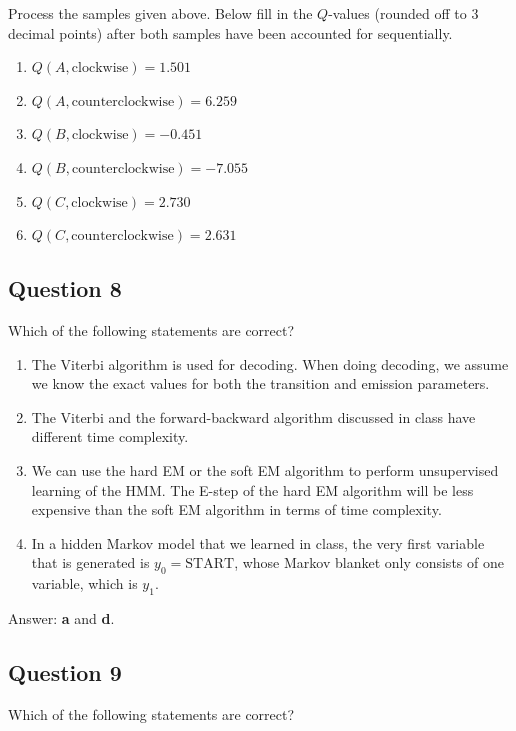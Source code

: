 \documentclass[11pt,fancychapters]{article}
\begin{document}
Process the samples given above. Below fill in the $Q$-values (rounded off to 3 decimal points) after both samples have been accounted for sequentially.

\begin{enumerate}[label=\textbf{\arabic*.}]
	\item $Q(A, \text{clockwise}) = 1.501$
	\item $Q(A, \text{counterclockwise}) = 6.259$
	\item $Q(B, \text{clockwise}) = -0.451$
	\item $Q(B, \text{counterclockwise}) = -7.055$
	\item $Q(C, \text{clockwise}) = 2.730$
	\item $Q(C, \text{counterclockwise}) = 2.631$
\end{enumerate}

\subsection*{Question 8 {\normalfont{[5 points]}}}

Which of the following statements are correct?

\begin{enumerate}[label=\textbf{\alph*.}]
	\item The Viterbi algorithm is used for decoding. When doing decoding, we assume we know the exact values for both the transition and emission parameters.
	\item The Viterbi and the forward-backward algorithm discussed in class have different time complexity.
	\item We can use the hard EM or the soft EM algorithm to perform unsupervised learning of the HMM. The E-step of the hard EM algorithm will be less expensive than the soft EM algorithm in terms of time complexity.
	\item In a hidden Markov model that we learned in class, the very first variable that is generated is $y_0 = \text{START}$, whose Markov blanket only consists of one variable, which is $y_1$.
\end{enumerate}

Answer: \textbf{a} and \textbf{d}.

\subsection*{Question 9 {\normalfont{[5 points]}}}

Which of the following statements are correct?
\end{document}
